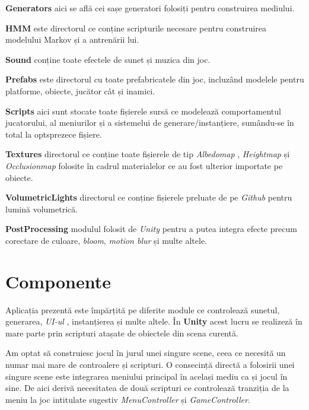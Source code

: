 \textbf{Generators} aici se află cei sașe generatori folosiți pentru construirea mediului.\par

\textbf{HMM} este directorul ce conține scripturile necesare pentru construirea modelului Markov și a antrenării lui.\par

\textbf{Sound} conține toate efectele de sunet și muzica din joc.\par

\textbf{Prefabs} este directorul cu toate prefabricatele din joc, incluzând modelele pentru platforme, obiecte, jucător cât și inamici.

\textbf{Scripts} aici sunt stocate toate fișierele sursă ce modelează comportamentul jucatorului, al meniurilor și a sistemelui de generare/instanțiere, sumându-se în total la optsprezece fișiere.\par

\textbf{Textures} directorul ce conține toate fișierele de tip \textit{Albedomap} , \textit{Heightmap} și \textit{Occlusionmap} folosite în cadrul materialelor ce au fost ulterior importate pe obiecte.\par

\textbf{VolumetricLights} directorul ce conține fișierele preluate de pe \textit{Github} pentru lumină volumetrică.\par

\textbf{PostProcessing} modulul folosit de \textit{Unity} pentru a putea integra efecte precum corectare de culoare, \textit{bloom}, \textit{motion blur} și multe altele.\par


\section{Componente}
Aplicația prezentă este împărțită pe diferite module ce controlează sunetul, generarea, \textit{UI-ul} , instanțierea și multe altele. În \textbf{Unity} acest lucru se realizeză în mare parte prin scripturi atașate de obiectele din scena curentă. \par

Am optat să construiesc jocul în jurul unei singure scene, ceea ce necesită un numar mai mare de controalere și scripturi. O consecință directă a folosirii unei singure scene este integrarea meniului principal în același mediu ca și jocul în sine. De aici derivă necesitatea de două scripturi ce controlează tranziția de la meniu la joc intitulate sugestiv \textit{MenuController} și \textit{GameController}.\par

